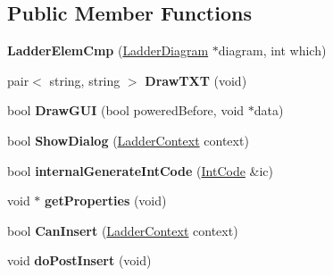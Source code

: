 \subsection*{Public Member Functions}
\begin{DoxyCompactItemize}
\item 
\hypertarget{class_ladder_elem_cmp_a7773a5bfe30b476a23d6cd667a7dcc66}{{\bfseries Ladder\-Elem\-Cmp} (\hyperlink{class_ladder_diagram}{Ladder\-Diagram} $\ast$diagram, int which)}\label{class_ladder_elem_cmp_a7773a5bfe30b476a23d6cd667a7dcc66}

\item 
\hypertarget{class_ladder_elem_cmp_a6b7bdfddbb2d5f3f2775a50bd1659652}{pair$<$ string, string $>$ {\bfseries Draw\-T\-X\-T} (void)}\label{class_ladder_elem_cmp_a6b7bdfddbb2d5f3f2775a50bd1659652}

\item 
\hypertarget{class_ladder_elem_cmp_a75e4aa7bc34311cb04956525713a2d96}{bool {\bfseries Draw\-G\-U\-I} (bool powered\-Before, void $\ast$data)}\label{class_ladder_elem_cmp_a75e4aa7bc34311cb04956525713a2d96}

\item 
\hypertarget{class_ladder_elem_cmp_a16f28f71fdba2a692680d7b7a3f48a3b}{bool {\bfseries Show\-Dialog} (\hyperlink{struct_ladder_context}{Ladder\-Context} context)}\label{class_ladder_elem_cmp_a16f28f71fdba2a692680d7b7a3f48a3b}

\item 
\hypertarget{class_ladder_elem_cmp_a9bb37cfff313aed38ad82be94bc533ac}{bool {\bfseries internal\-Generate\-Int\-Code} (\hyperlink{class_int_code}{Int\-Code} \&ic)}\label{class_ladder_elem_cmp_a9bb37cfff313aed38ad82be94bc533ac}

\item 
\hypertarget{class_ladder_elem_cmp_a40247762fb1e1efd0b299eaafe40d80f}{void $\ast$ {\bfseries get\-Properties} (void)}\label{class_ladder_elem_cmp_a40247762fb1e1efd0b299eaafe40d80f}

\item 
\hypertarget{class_ladder_elem_cmp_a9b9a27b425875dbd197e1412f381fd5d}{bool {\bfseries Can\-Insert} (\hyperlink{struct_ladder_context}{Ladder\-Context} context)}\label{class_ladder_elem_cmp_a9b9a27b425875dbd197e1412f381fd5d}

\item 
\hypertarget{class_ladder_elem_cmp_acd4a0c266bf429bd9b96a4ce88ad93c2}{void {\bfseries do\-Post\-Insert} (void)}\label{class_ladder_elem_cmp_acd4a0c266bf429bd9b96a4ce88ad93c2}


\end{DoxyCompactItemize}

